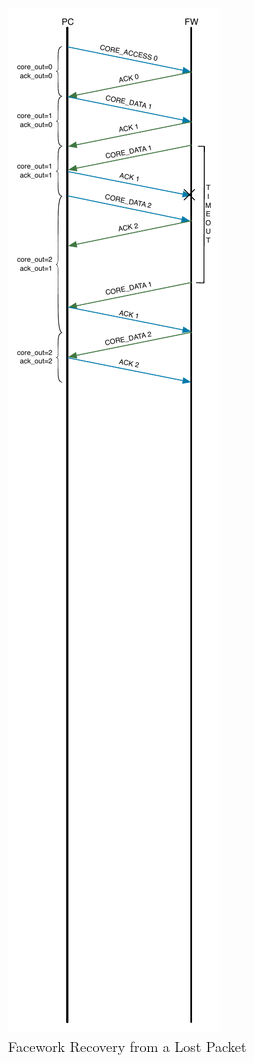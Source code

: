 \documentclass[defaultstyle,10pt,master,Helvetica]{thesis}
\begin{document}
\begin{figure}[h]
  \centering
      \includegraphics[scale=1.2,center]{Diagrams/Diag-EX.pdf}
  \caption{Facework Recovery from a Lost Packet}\label{fig:Diag-EX}
\end{figure}
\end{document}
